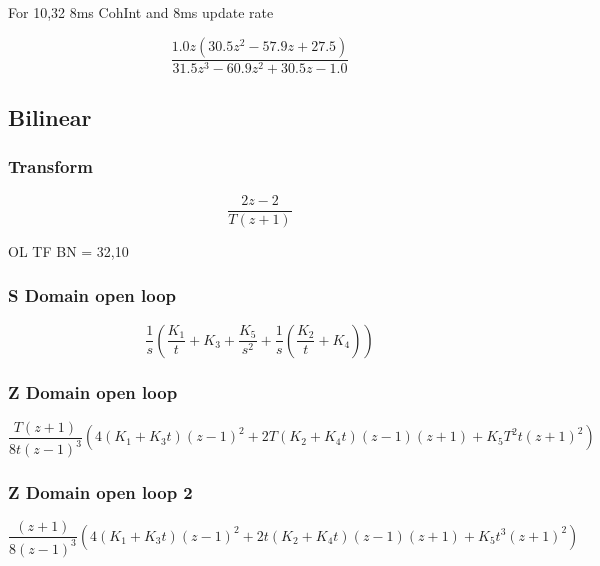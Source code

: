 For 10,32 8ms CohInt and 8ms update rate

\begin{equation}
\frac{1.0 z \left(30.5 z^{2} - 57.9 z + 27.5\right)}{31.5 z^{3} - 60.9 z^{2} + 30.5 z - 1.0}
\end{equation}


\cite{arashBook}
\clearpage


\subsection{Bilinear}

\subsubsection{Transform}
\begin{equation}
\frac{2 z - 2}{T \left(z + 1\right)}
\end{equation}

OL TF BN = 32,10

\subsubsection{S Domain open loop}
\begin{equation}
\frac{1}{s} \left(\frac{K_{1}}{t} + K_{3} + \frac{K_{5}}{s^{2}} + \frac{1}{s} \left(\frac{K_{2}}{t} + K_{4}\right)\right)
\end{equation}

\subsubsection{Z Domain open loop}

\begin{equation}
\frac{T\left(z + 1\right) }{8 t \left(z - 1\right)^{3}} \left(4(K_{1}  + K_{3} t)  \left(z - 1\right)^{2}  + 2 T \left(K_{2} + K_{4} t\right) \left(z - 1\right) \left(z + 1\right) + K_{5} T^{2} t \left(z + 1\right)^{2} \right)
\end{equation}

\subsubsection{Z Domain open loop 2}
\begin{equation}
\frac{\left(z + 1\right)}{8 \left(z - 1\right)^{3}} \left(4(K_{1}  + K_{3} t)  \left(z - 1\right)^{2} + 2 t \left(K_{2} + K_{4} t\right) \left(z - 1\right) \left(z + 1\right) + K_{5} t^{3} \left(z + 1\right)^{2}\right)
\end{equation}


